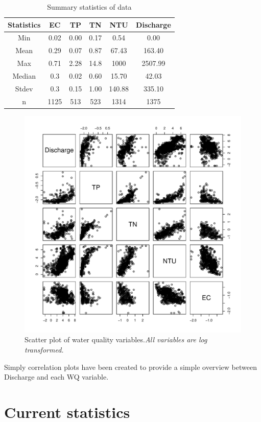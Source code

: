 \documentclass[5p]{elsarticle}
\begin{document}
\begin{center}
\begin{table}
\caption[stat]{Summary statistics of data}
\begin{tabular}{|c|c|c|c|c|c|}
\hline
Statistics & EC & TP & TN & NTU & Discharge\\
\hline
Min & 0.02& 0.00& 0.17& 0.54&0.00\\
Mean & 0.29& 0.07&0.87 & 67.43&163.40\\
Max & 0.71& 2.28& 14.8& 1000&2507.99\\
Median &0.3&0.02 &0.60 &15.70 &42.03\\
Stdev & 0.3& 0.15& 1.00& 140.88&335.10\\
n & 1125&513 &523 &1314 &1375\\
\hline
\end{tabular}
\end{table}
\end{center}

\begin{center}
\begin{figure}
\includegraphics[scale=0.50]{Scatterplotmatrix.pdf}
\caption{Scatter plot of water quality variables.\it{All variables are log transformed.}}
\end{figure}
\end{center}

Simply correlation plots have been created to provide a simple overview between Discharge and each WQ variable.


\section*{Current statistics}
\end{document}
